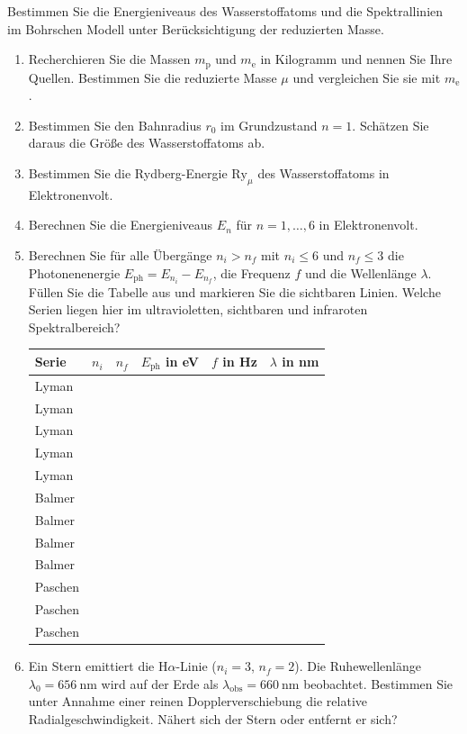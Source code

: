 \begin{ExerciseBlock}
Bestimmen Sie die Energieniveaus des Wasserstoffatoms und die Spektrallinien im Bohrschen Modell unter Berücksichtigung der reduzierten Masse.
\begin{enumerate}
\item Recherchieren Sie die Massen $m_\mathrm p$ und $m_\mathrm e$ in Kilogramm und nennen Sie Ihre Quellen. Bestimmen Sie die reduzierte Masse $\mu$ und vergleichen Sie sie mit $m_\mathrm e$.
\item Bestimmen Sie den Bahnradius $r_0$ im Grundzustand $n=1$. Schätzen Sie daraus die Größe des Wasserstoffatoms ab.
\item Bestimmen Sie die Rydberg-Energie $\mathrm{Ry}_\mu$ des Wasserstoffatoms in Elektronenvolt.
\item Berechnen Sie die Energieniveaus $E_n$ für $n=1,\dots,6$ in Elektronenvolt.
\item Berechnen Sie für alle Übergänge $n_i>n_f$ mit $n_i\le6$ und $n_f\le3$ die Photonenenergie $E_\mathrm{ph}=E_{n_i}-E_{n_f}$, die Frequenz $f$ und die Wellenlänge $\lambda$. Füllen Sie die Tabelle aus und markieren Sie die sichtbaren Linien. Welche Serien liegen hier im ultravioletten, sichtbaren und infraroten Spektralbereich?
\begin{center}
\begin{tabular}{lrrrrr}
\toprule
Serie & $n_i$ & $n_f$ & $E_\mathrm{ph}$ in \unit{\electronvolt} & $f$ in \unit{\hertz} & $\lambda$ in \unit{\nano\metre}\\
\midrule
Lyman & & & & & \\
Lyman & & & & & \\
Lyman & & & & & \\
Lyman & & & & & \\
Lyman & & & & & \\
Balmer & & & & & \\
Balmer & & & & & \\
Balmer & & & & & \\
Balmer & & & & & \\
Paschen & & & & & \\
Paschen & & & & & \\
Paschen & & & & & \\
\bottomrule
\end{tabular}
\end{center}
\item Ein Stern emittiert die H$\alpha$-Linie ($n_i=3$, $n_f=2$). Die Ruhewellenlänge $\lambda_0=\qty{656}{\nano\metre}$ wird auf der Erde als $\lambda_\mathrm{obs}=\qty{660}{\nano\metre}$ beobachtet. Bestimmen Sie unter Annahme einer reinen Dopplerverschiebung die relative Radialgeschwindigkeit. Nähert sich der Stern oder entfernt er sich?
\end{enumerate}
\end{ExerciseBlock}
